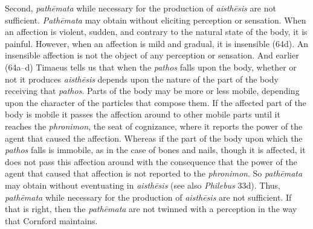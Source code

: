 Second, \emph{pathēmata} while necessary for the production of \emph{aisthēsis} are not sufficient. \emph{Pathēmata} may obtain without eliciting perception or sensation. When an affection is violent, sudden, and contrary to the natural state of the body, it is painful. However, when an affection is mild and gradual, it is insensible (64d). An insensible affection is not the object of any perception or sensation. And earlier (64a--d) Timaeus tells us that when the \emph{pathos} falls upon the body, whether or not it produces \emph{aisthēsis} depends upon the nature of the part of the body receiving that \emph{pathos}. Parts of the body may be more or less mobile, depending upon the character of the particles that compose them. If the affected part of the body is mobile it passes the affection around to other mobile parts until it reaches the \emph{phronimon}, the seat of cognizance, where it reports the power of the agent that caused the affection. Whereas if the part of the body upon which the \emph{pathos} falls is immobile, as in the case of bones and nails, though it is affected, it does not pass this affection around with the consequence that the power of the agent that caused that affection is not reported to the \emph{phronimon}. So \emph{pathēmata} may obtain without eventuating in \emph{aisthēsis} (see also \emph{Philebus} 33d). Thus, \emph{pathēmata} while necessary for the production of \emph{aisthēsis} are not sufficient. If that is right, then the \emph{pathēmata} are not twinned with a perception in the way that Cornford maintains.

